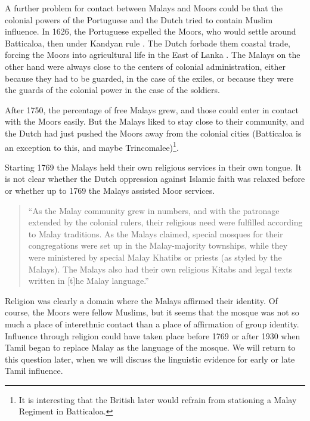 A further problem for contact between Malays and Moors could be that the colonial powers of the Portuguese and the Dutch tried to contain Muslim influence. In 1626, the Portuguese expelled the Moors, who would settle around Batticaloa, then under Kandyan rule \citep[113]{Codrington1926}.
The Dutch  forbade them coastal trade, forcing the Moors into agricultural life in the East of Lanka \citep[42]{Hussainmiya1990}.\kuckn
The Malays on the other hand were always close to the centers of colonial administration, either because they had to be guarded, in the case of the exiles, or because they were the guards of the colonial power in the case of the soldiers.

After 1750\kuckn, the percentage of free Malays grew, and those could enter in contact with the Moors easily. But the Malays liked to stay close to  their community, and the Dutch had just pushed the Moors away from the colonial cities (Batticaloa is an exception to this, and maybe Trincomalee)\footnote{It is interesting that the British later would refrain from stationing a Malay Regiment in Batticaloa.}.\kuckn

Starting 1769 the Malays held their own religious services in their own tongue. It is not clear whether the Dutch oppression against Islamic faith was relaxed before or whether up to 1769 the Malays assisted Moor services.

\begin{quote}
    ``As the Malay community grew in numbers, and with the patronage extended by the colonial rulers, their religious need were fulfilled according to Malay traditions. As the Malays claimed, special mosques for their congregations were set up in the Malay-majority townships, while they were ministered by special Malay Khatibs or priests (as styled by the Malays). The Malays also had their own religious Kitabs and legal texts written in [t]he Malay language.'' \citet[19]{Hussainmiya1987}
\end{quote}


Religion was clearly a domain where the Malays affirmed their identity. Of course, the Moors were fellow Muslims, but it seems that the mosque was not so much a place of interethnic contact than a place of affirmation of group identity. Influence through religion could have taken place before 1769 or after 1930 when Tamil began to replace Malay as the language of the mosque. We will return to this question later, when we will discuss the linguistic evidence for early or late Tamil influence.\kuckn


